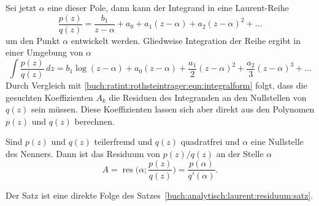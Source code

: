 Sei jetzt $\alpha$ eine dieser Pole, dann kann der Integrand
in eine Laurent-Reihe
%
\[
\frac{p(z)}{q(z)}
=
\frac{b_1}{z-\alpha}
+
a_0+a_1(z-\alpha) + a_2(z-\alpha)^2+\ldots
\]
um den Punkt $\alpha$ entwickelt werden.
Gliedweise Integration der Reihe ergibt in einer Umgebung von $\alpha$
\[
\int
\frac{p(z)}{q(z)}
\,dz
=
b_1\log(z-\alpha)
+
a_0(z-\alpha) + \frac{a_1}{2}(z-\alpha)^2 + \frac{a_2}{3}(z-\alpha)^3
+\ldots
\]
Durch Vergleich mit
\eqref{buch:ratint:rothsteintrager:eqn:integralform}
folgt, dass die gesuchten Koeffizienten $A_k$ die Residuen
des Integranden an den Nullstellen von $q(z)$ sein müssen.
%
Diese Koeffizienten lassen sich aber direkt aus den Polynomen 
$p(z)$ und $q(z)$ berechnen.

\begin{satz}
\label{buch:ratint:rothsteintrager:satz:residuum}
Sind $p(z)$ und $q(z)$ teilerfremd und $q(z)$ quadratfrei und
$\alpha$ eine Nullstelle des Nenners.
Dann ist das Residuum von $p(z)/q(z)$ an der Stelle $\alpha$
\[
A
=
\operatorname{res}\biggl(\alpha;\frac{p(z)}{q(z)}\biggr)
=
\frac{p(\alpha)}{q'(\alpha)}.
\]
%
\end{satz}

Der Satz ist eine direkte Folge des
Satzes~\ref{buch:analytisch:laurent:residuum:satz}.

